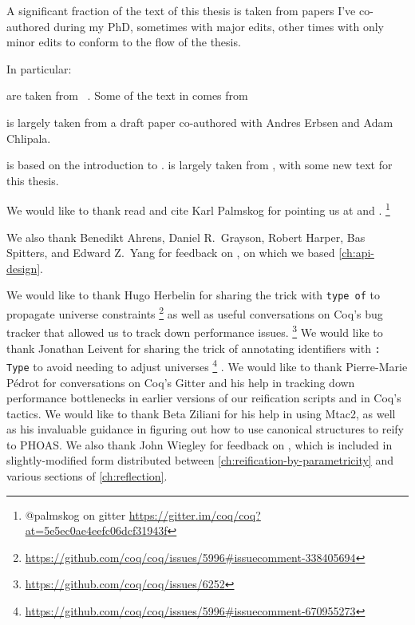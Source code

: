 

A significant fraction of the text of this thesis is taken from papers I've co-authored during my PhD, sometimes with major edits, other times with only minor edits to conform to the flow of the thesis.

In particular:

 are taken from ~\cite{category-coq-experience}.
Some of the text in  comes from ~\cite{category-coq-experience}

 is largely taken from a draft paper co-authored with Andres Erbsen and Adam Chlipala.

 is based on the introduction to \textcite{reification-by-parametricity}.
 is largely taken from \textcite{reification-by-parametricity}, with some new text for this thesis.

We would like to thank read and cite Karl Palmskog for pointing us at \textcite{Should1999Lamport} and \textcite{Formalising2018Paulson}.%
\footnote{@palmskog on gitter \url{https://gitter.im/coq/coq?at=5e5ec0ae4eefc06dcf31943f}}

We also thank Benedikt Ahrens, Daniel R.~Grayson, Robert Harper, Bas Spitters, and Edward Z.~Yang for feedback on \textcite{category-coq-experience}, on which we based \autoref{ch:api-design}.

We would like to thank Hugo Herbelin for sharing the trick with \texttt{type of} to propagate universe constraints%
\footnote{%
    \url{https://github.com/coq/coq/issues/5996\#issuecomment-338405694}%
}
as well as useful conversations on Coq's bug tracker that allowed us to track down performance issues.%
\footnote{%
    \url{https://github.com/coq/coq/issues/6252}%
}
We would like to thank Jonathan Leivent for sharing the trick of annotating identifiers with \texttt{: Type} to avoid needing to adjust universes%
\footnote{%
  \url{https://github.com/coq/coq/issues/5996\#issuecomment-670955273}
}%
.
We would like to thank Pierre-Marie Pédrot for conversations on Coq's Gitter and his help in tracking down performance bottlenecks in earlier versions of our reification scripts and in Coq's tactics.
We would like to thank Beta Ziliani for his help in using Mtac2, as well as his invaluable guidance in figuring out how to use canonical structures to reify to PHOAS.
We also thank John Wiegley for feedback on \textcite{reification-by-parametricity}, which is included in slightly-modified form distributed between \autoref{ch:reification-by-parametricity} and various sections of \autoref{ch:reflection}.

